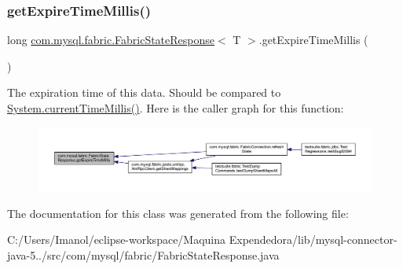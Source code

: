 \subsubsection{\texorpdfstring{get\+Expire\+Time\+Millis()}{getExpireTimeMillis()}}
{\footnotesize\ttfamily long \mbox{\hyperlink{classcom_1_1mysql_1_1fabric_1_1_fabric_state_response}{com.\+mysql.\+fabric.\+Fabric\+State\+Response}}$<$ T $>$.get\+Expire\+Time\+Millis (\begin{DoxyParamCaption}{ }\end{DoxyParamCaption})}

The expiration time of this data. Should be compared to \mbox{\hyperlink{}{System.\+current\+Time\+Millis()}}. Here is the caller graph for this function\+:\nopagebreak
\begin{figure}[H]
\begin{center}
\leavevmode
\includegraphics[width=350pt]{classcom_1_1mysql_1_1fabric_1_1_fabric_state_response_addba05821ef4572c9270bfea44f36826_icgraph}
\end{center}
\end{figure}


The documentation for this class was generated from the following file\+:\begin{DoxyCompactItemize}
\item 
C\+:/\+Users/\+Imanol/eclipse-\/workspace/\+Maquina Expendedora/lib/mysql-\/connector-\/java-\/5../src/com/mysql/fabric/Fabric\+State\+Response.\+java\end{DoxyCompactItemize}
